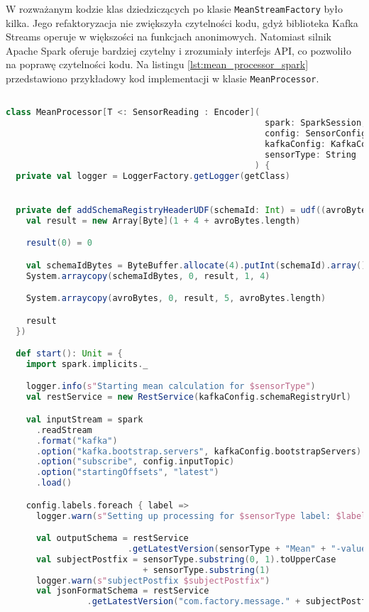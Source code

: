 W rozważanym kodzie klas dziedziczących po klasie \texttt{MeanStreamFactory} było kilka. Jego refaktoryzacja nie zwiększyła czytelności kodu, gdyż biblioteka Kafka Streams operuje w większości na funkcjach anonimowych. Natomiast silnik Apache Spark oferuje bardziej czytelny i zrozumiały interfejs API, co pozwoliło na poprawę czytelności kodu. Na listingu \ref{lst:mean_processor_spark} przedstawiono przykładowy kod implementacji w klasie \texttt{MeanProcessor}.

\begin{lstlisting}[caption={Implementacja w klasie MeanProcessor za pomocą Apache Spark}, label={lst:mean_processor_spark},language=Scala]

class MeanProcessor[T <: SensorReading : Encoder](
                                                   spark: SparkSession,
                                                   config: SensorConfig,
                                                   kafkaConfig: KafkaConfig,
                                                   sensorType: String
                                                 ) {
  private val logger = LoggerFactory.getLogger(getClass)


  private def addSchemaRegistryHeaderUDF(schemaId: Int) = udf((avroBytes: Array[Byte]) => {
    val result = new Array[Byte](1 + 4 + avroBytes.length)

    result(0) = 0

    val schemaIdBytes = ByteBuffer.allocate(4).putInt(schemaId).array()
    System.arraycopy(schemaIdBytes, 0, result, 1, 4)

    System.arraycopy(avroBytes, 0, result, 5, avroBytes.length)

    result
  })

  def start(): Unit = {
    import spark.implicits._

    logger.info(s"Starting mean calculation for $sensorType")
    val restService = new RestService(kafkaConfig.schemaRegistryUrl)

    val inputStream = spark
      .readStream
      .format("kafka")
      .option("kafka.bootstrap.servers", kafkaConfig.bootstrapServers)
      .option("subscribe", config.inputTopic)
      .option("startingOffsets", "latest")
      .load()

    config.labels.foreach { label =>
      logger.warn(s"Setting up processing for $sensorType label: $label")

      val outputSchema = restService
                        .getLatestVersion(sensorType + "Mean" + "-value")
      val subjectPostfix = sensorType.substring(0, 1).toUpperCase 
                           + sensorType.substring(1)
      logger.warn(s"subjectPostfix $subjectPostfix")
      val jsonFormatSchema = restService
                .getLatestVersion("com.factory.message." + subjectPostfix)


\end{lstlisting}
